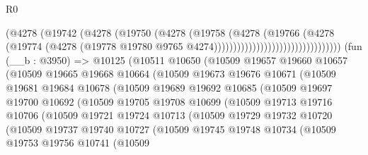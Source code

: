 \begin{lexlean}{R0}
\begin{coremodule}
                                              (@4278
                                                (@19742
                                                  (@4278
                                                    (@19750
                                                      (@4278
                                                        (@19758
                                                          (@4278
                                                            (@19766
                                                              (@4278
                                                                (@19774
                                                                  (@4278
                                                                    (@19778
                                                                      @19780
                                                                      @9765
                                                                      @4274)))))))))))))))))))))))))))))))))
    (fun (__b : @3950) =>
    @10125
      (@10511
        @10650
        (@10509
          @19657
          @19660
          @10657
          (@10509
            @19665
            @19668
            @10664
            (@10509
              @19673
              @19676
              @10671
              (@10509
                @19681
                @19684
                @10678
                (@10509
                  @19689
                  @19692
                  @10685
                  (@10509
                    @19697
                    @19700
                    @10692
                    (@10509
                      @19705
                      @19708
                      @10699
                      (@10509
                        @19713
                        @19716
                        @10706
                        (@10509
                          @19721
                          @19724
                          @10713
                          (@10509
                            @19729
                            @19732
                            @10720
                            (@10509
                              @19737
                              @19740
                              @10727
                              (@10509
                                @19745
                                @19748
                                @10734
                                (@10509
                                  @19753
                                  @19756
                                  @10741
                                  (@10509

\end{coremodule}
\end{lexlean}
